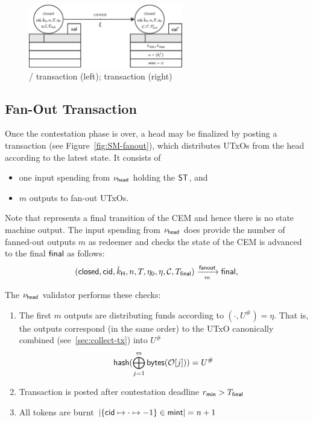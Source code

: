 \begin{figure}[h]
	\centering
	\includegraphics[width=0.6\textwidth]{figures/SM-contest.pdf}
	\caption{\mtxClose{}/\mtxContest{} transaction (left); \mtxContest{}
		transaction (right)}\label{fig:SM-contest}
\end{figure}

\subsection{Fan-Out Transaction}

\begin{samepage}
	Once the contestation phase is over, a head may be finalized by posting a
	\mtxFanout{} transaction (see Figure~\ref{fig:SM-fanout}), which
	distributes UTxOs from the head according to the latest state. It consists of
	\begin{itemize}
		\item one input spending from $\nu_\mathsf{head}$ holding the $\mathsf{ST}$, and
		\item $m$ outputs to fan-out UTxOs.
	\end{itemize}
	Note that \mtxFanout{} represents a final transition of the CEM and hence there
	is no state machine output. The input spending from $\nu_\mathsf{head}$ does provide the
	number of fanned-out outputs $m$ as redeemer and checks the state of the CEM is
	advanced to the final $\mathsf{final}$ as follows:
	\[
		(\mathsf{closed},\mathsf{cid},\tilde{k}_{\mathsf{H}},n,T,\eta_0,\eta,\mathcal{C},T_{\mathsf{final}}) \xrightarrow[m]{\mathsf{fanout}} \mathsf{final},
	\]
\end{samepage}

\noindent The $\nu_\mathsf{head}$ validator performs these checks:
\begin{enumerate}
	\item The first $m$ outputs are distributing funds according to
	      $(\cdot, U^{\#}) = \eta$. That is, the outputs correspond (in the same
	      order) to the UTxO canonically combined (see~\ref{sec:collect-tx}) into
	      $U^{\#}$
	      \[
		      \mathsf{hash}(\bigoplus_{j=1}^{m} \mathsf{bytes}(\mathcal{O}[j])) = U^{\#}
	      \]
	\item Transaction is posted after contestation deadline $r_{\mathsf{min}} > T_{\mathsf{final}}$
	\item All tokens are burnt
	      $|\{\mathsf{cid} \mapsto \cdot \mapsto -1\} \in \mathsf{mint}| = n + 1$
\end{enumerate}

